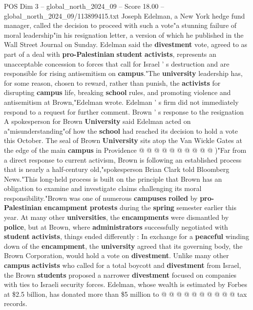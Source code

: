 \begin{textsample}{POS Dim 3 – global\_north\_2024\_09 – Score 18.00 – global\_north\_2024\_09/113899415.txt}  \label{ex:f3_pos_165}
Joseph Edelman, a New York hedge fund manager, called the decision to proceed with such a vote"a stunning failure of moral leadership"in his resignation letter, a version of which he published in the Wall Street Journal on Sunday.
Edelman said the \textbf{divestment} vote, agreed to as part of a deal with \textbf{pro-Palestinian} \textbf{student} \textbf{activists}, represents an unacceptable concession to forces that call for Israel ' s destruction and are responsible for rising antisemitism on \textbf{campus}."The \textbf{university} leadership has, for some reason, chosen to reward, rather than punish, the \textbf{activists} for disrupting \textbf{campus} life, breaking \textbf{school} rules, and promoting violence and antisemitism at Brown,"Edelman wrote.
Edelman ' s firm did not immediately respond to a request for further comment.
Brown ' s response to the resignation A spokesperson for Brown \textbf{University} said Edelman acted on a"misunderstanding"of how the \textbf{school} had reached its decision to hold a vote this October.
The seal of Brown \textbf{University} sits atop the Van Wickle Gates at the edge of the main \textbf{campus} in Providence @ @ @ @ @ @ @ @ @ @ )"Far from a direct response to current activism, Brown is following an established process that is nearly a half-century old,"spokesperson Brian Clark told Bloomberg News."This long-held process is built on the principle that Brown has an obligation to examine and investigate claims challenging its moral responsibility."Brown was one of numerous \textbf{campuses} \textbf{roiled} by \textbf{pro-Palestinian} \textbf{encampment} \textbf{protests} during the \textbf{spring} semester earlier this year.
At many other \textbf{universities}, the \textbf{encampments} were dismantled by \textbf{police}, but at Brown, where \textbf{administrators} successfully negotiated with \textbf{student} \textbf{activists}, things ended differently : In exchange for a \textbf{peaceful} winding down of the \textbf{encampment}, the \textbf{university} agreed that its governing body, the Brown Corporation, would hold a vote on \textbf{divestment}.
Unlike many other \textbf{campus} \textbf{activists} who called for a total boycott and \textbf{divestment} from Israel, the Brown \textbf{students} proposed a narrower \textbf{divestment} focused on companies with ties to Israeli security forces.
Edelman, whose wealth is estimated by Forbes at \$2.5 billion, has donated more than \$5 million to @ @ @ @ @ @ @ @ @ @ tax records.

\end{textsample}
